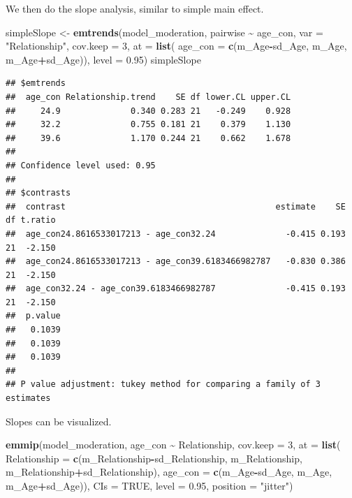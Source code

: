 \documentclass[
]{ctexart}
\newenvironment{Shaded}{\begin{snugshade}}{\end{snugshade}}
\newcommand{\AttributeTok}[1]{\textcolor[rgb]{0.13,0.29,0.53}{#1}}
\newcommand{\ConstantTok}[1]{\textcolor[rgb]{0.56,0.35,0.01}{#1}}
\newcommand{\DecValTok}[1]{\textcolor[rgb]{0.00,0.00,0.81}{#1}}
\newcommand{\FloatTok}[1]{\textcolor[rgb]{0.00,0.00,0.81}{#1}}
\newcommand{\FunctionTok}[1]{\textcolor[rgb]{0.13,0.29,0.53}{\textbf{#1}}}
\newcommand{\NormalTok}[1]{#1}
\newcommand{\OtherTok}[1]{\textcolor[rgb]{0.56,0.35,0.01}{#1}}
\newcommand{\SpecialCharTok}[1]{\textcolor[rgb]{0.81,0.36,0.00}{\textbf{#1}}}
\newcommand{\StringTok}[1]{\textcolor[rgb]{0.31,0.60,0.02}{#1}}
\begin{document}
We then do the slope analysis, similar to simple main effect.

\begin{Shaded}
\begin{Highlighting}[]
\NormalTok{simpleSlope }\OtherTok{\textless{}{-}} \FunctionTok{emtrends}\NormalTok{(model\_moderation, }
\NormalTok{                        pairwise }\SpecialCharTok{\textasciitilde{}}\NormalTok{ age\_con, }
                        \AttributeTok{var =} \StringTok{"Relationship"}\NormalTok{,}
                        \AttributeTok{cov.keep =} \DecValTok{3}\NormalTok{, }
                        \AttributeTok{at =} \FunctionTok{list}\NormalTok{(}
                          \AttributeTok{age\_con =} \FunctionTok{c}\NormalTok{(m\_Age}\SpecialCharTok{{-}}\NormalTok{sd\_Age, m\_Age, m\_Age}\SpecialCharTok{+}\NormalTok{sd\_Age)), }
                        \AttributeTok{level =} \FloatTok{0.95}\NormalTok{)}
\NormalTok{simpleSlope}
\end{Highlighting}
\end{Shaded}

\begin{verbatim}
## $emtrends
##  age_con Relationship.trend    SE df lower.CL upper.CL
##     24.9              0.340 0.283 21   -0.249    0.928
##     32.2              0.755 0.181 21    0.379    1.130
##     39.6              1.170 0.244 21    0.662    1.678
## 
## Confidence level used: 0.95 
## 
## $contrasts
##  contrast                                          estimate    SE df t.ratio
##  age_con24.8616533017213 - age_con32.24              -0.415 0.193 21  -2.150
##  age_con24.8616533017213 - age_con39.6183466982787   -0.830 0.386 21  -2.150
##  age_con32.24 - age_con39.6183466982787              -0.415 0.193 21  -2.150
##  p.value
##   0.1039
##   0.1039
##   0.1039
## 
## P value adjustment: tukey method for comparing a family of 3 estimates
\end{verbatim}

Slopes can be visualized.

\begin{Shaded}
\begin{Highlighting}[]
\FunctionTok{emmip}\NormalTok{(model\_moderation, }
\NormalTok{      age\_con }\SpecialCharTok{\textasciitilde{}}\NormalTok{ Relationship, }
      \AttributeTok{cov.keep =} \DecValTok{3}\NormalTok{,}
      \AttributeTok{at =} \FunctionTok{list}\NormalTok{(}
        \AttributeTok{Relationship =} \FunctionTok{c}\NormalTok{(m\_Relationship}\SpecialCharTok{{-}}\NormalTok{sd\_Relationship,}
\NormalTok{                         m\_Relationship,}
\NormalTok{                         m\_Relationship}\SpecialCharTok{+}\NormalTok{sd\_Relationship),}
        \AttributeTok{age\_con =} \FunctionTok{c}\NormalTok{(m\_Age}\SpecialCharTok{{-}}\NormalTok{sd\_Age, m\_Age, m\_Age}\SpecialCharTok{+}\NormalTok{sd\_Age)), }
      \AttributeTok{CIs =} \ConstantTok{TRUE}\NormalTok{, }\AttributeTok{level =} \FloatTok{0.95}\NormalTok{, }\AttributeTok{position =} \StringTok{"jitter"}\NormalTok{)}
\end{Highlighting}
\end{Shaded}
\end{document}
